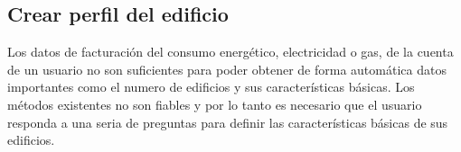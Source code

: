 \subsection{Crear perfil del edificio}

Los datos de facturación del consumo energético, electricidad o gas, de la cuenta
de un usuario no son suficientes para poder obtener de forma automática datos
importantes como el numero de edificios y sus características básicas.
Los métodos existentes no son fiables y por lo tanto es necesario que el usuario
responda a una seria de preguntas para definir las características básicas
de sus edificios.

